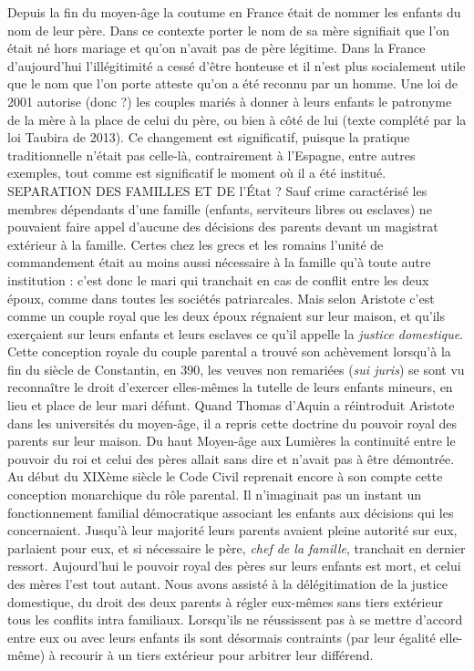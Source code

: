  Depuis la fin du moyen-âge la coutume en France était de nommer les enfants du nom de leur père. Dans ce contexte porter le nom de sa mère signifiait que l'on était né hors mariage et qu'on n'avait pas de père légitime. Dans la France d'aujourd'hui l'illégitimité a cessé d'être honteuse et il n'est plus socialement utile que le nom que l'on porte atteste qu'on a été reconnu par un homme. Une loi de 2001 autorise (donc ?) les couples mariés à donner à leurs enfants le patronyme de la mère à la place de celui du père, ou bien à côté de lui (texte complété par la loi Taubira de 2013). Ce changement est significatif, puisque la pratique traditionnelle n'était pas celle-là, contrairement à l'Espagne, entre autres exemples, tout comme est significatif le moment où il a été institué. 
SEPARATION DES FAMILLES ET DE l'État ? 
 Sauf crime caractérisé les membres dépendants d'une famille (enfants, serviteurs libres ou esclaves) ne pouvaient faire appel d'aucune des décisions des parents devant un magistrat extérieur à la famille. Certes chez les grecs et les romains l'unité de commandement était au moins aussi nécessaire à la famille qu'à toute autre institution : c'est donc le mari qui tranchait en cas de conflit entre les deux époux, comme dans toutes les sociétés patriarcales. Mais selon Aristote c'est comme un couple royal que les deux époux régnaient sur leur maison, et qu'ils exerçaient sur leurs enfants et leurs esclaves ce qu'il appelle la \emph{justice domestique}. Cette conception royale du couple parental a trouvé son achèvement lorsqu'à la fin du siècle de Constantin, en 390, les veuves non remariées (\emph{sui juris}) se sont vu reconnaître le droit d'exercer elles-mêmes la tutelle de leurs enfants mineurs, en lieu et place de leur mari défunt. Quand Thomas d'Aquin a réintroduit Aristote dans les universités du moyen-âge, il a repris cette doctrine du pouvoir royal des parents sur leur maison. 
 Du haut Moyen-âge aux Lumières la continuité entre le pouvoir du roi et celui des pères allait sans dire et n'avait pas à être démontrée. Au début du XIXème siècle le Code Civil reprenait encore à son compte cette conception monarchique du rôle parental. Il n'imaginait pas un instant un fonctionnement familial démocratique associant les enfants aux décisions qui les concernaient. Jusqu'à leur majorité leurs parents avaient pleine autorité sur eux, parlaient pour eux, et si nécessaire le père, \emph{chef de la famille}, tranchait en dernier ressort.
 Aujourd'hui le pouvoir royal des pères sur leurs enfants est mort, et celui des mères l'est tout autant. Nous avons assisté à la délégitimation de la justice domestique, du droit des deux parents à régler eux-mêmes sans tiers extérieur tous les conflits intra familiaux. Lorsqu'ils ne réussissent pas à se mettre d'accord entre eux ou avec leurs enfants ils sont désormais contraints (par leur égalité elle-même) à recourir à un tiers extérieur pour arbitrer leur différend. 
